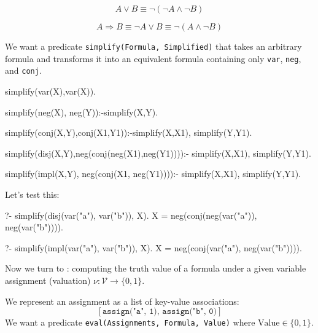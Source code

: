 \[
A \vee B \equiv \neg(\neg A \wedge \neg B)
\]

\[
A \Rightarrow B \equiv \neg A \vee B \equiv \neg(A \wedge \neg B)
\]


We want a predicate \texttt{simplify(Formula, Simplified)} that takes an arbitrary formula and transforms it into an equivalent formula containing only \texttt{var}, \texttt{neg}, and \texttt{conj}.


\begin{codeblock}
simplify(var(X),var(X)).

simplify(neg(X), neg(Y)):-simplify(X,Y).

simplify(conj(X,Y),conj(X1,Y1)):-simplify(X,X1), simplify(Y,Y1).

simplify(disj(X,Y),neg(conj(neg(X1),neg(Y1)))):-
    simplify(X,X1),
    simplify(Y,Y1).

simplify(impl(X,Y), neg(conj(X1, neg(Y1)))):-
    simplify(X,X1),
    simplify(Y,Y1).
\end{codeblock}

Let's test this:

\begin{codeblock}
?- simplify(disj(var("a"), var("b")), X).
X = neg(conj(neg(var("a")), neg(var("b")))).

?- simplify(impl(var("a"), var("b")), X).
X = neg(conj(var("a"), neg(var("b")))).
\end{codeblock}

Now we turn to : computing the truth value of a formula under a given variable assignment (valuation) $\nu : \mathcal{V} \to \{0, 1\}$.

We represent an assignment as a list of key-value associations:
\[
[\texttt{assign("a", 1)},\, \texttt{assign("b", 0)}]
\]
We want a predicate \texttt{eval(Assignments, Formula, Value)} where $\text{Value} \in \{0, 1\}$.



